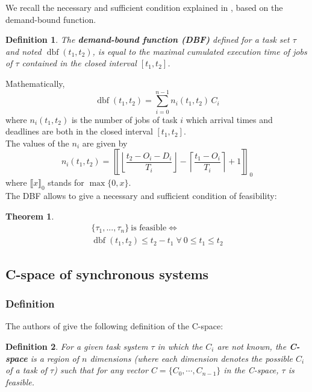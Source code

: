 \documentclass[times, 10pt,twocolumn, a4paper]{article}
\newtheorem{theorem}{Theorem}
\newtheorem{definition}{Definition}
\newcommand{\dbf}[1]{\operatorname{dbf}(#1)}
\begin{document}
	We recall the necessary and sufficient condition explained in \cite{baruah1999generalized, baruah1990algorithms}, based on the demand-bound function.

	\begin{definition}
		The \textbf{demand-bound function (DBF)}
		defined for a task set $\tau$ and noted $\dbf{t_1, t_2}$, is equal to
		the maximal cumulated execution time of jobs of $\tau$ contained in the
		closed interval $[t_1, t_2]$.
	\end{definition}

	Mathematically,
	\[
		\dbf{t_1, t_2} = \sum_{i=0}^{n-1} n_i(t_1, t_2) \, C_i
	\]
	where $n_i(t_1, t_2)$ is the number of jobs of task $i$ which arrival times
	and deadlines are both in the closed interval $[t_1, t_2]$.\\

	The values of the $n_i$ are given by
	\[
		n_i(t_1, t_2) = 
		\left\llbracket
			\left\lfloor
				\frac{t_2 - O_i - D_i}{T_i}
			\right\rfloor - 
			\left\lceil 
				\frac{t_1 - O_i}{T_i} 
			\right\rceil + 1 
		\right\rrbracket_0
	\]
	where $\llbracket x \rrbracket_0$ stands for $\max \{ 0, x \}$.\\

	The DBF allows to give a necessary and sufficient condition of feasibility:

	\begin{theorem}
	\[
		\begin{array}{c}
			\{\tau_1, ..., \tau_n\} \: \text{is feasible}  \iff \\
			\dbf{t_1, t_2} \leq t_2 - t_1 \; \forall \: 0 \leq t_1 \leq t_2
		\end{array}
	\]
	\end{theorem}

	\subsection{C-space of synchronous systems}

		\subsubsection{Definition}

			The authors of \cite{george2009characterization} give the following definition of the C-space:
			\begin{definition}
				For a given task system $\tau$ in which the $C_i$ are not known, the
				\textbf{C-space} is a region of $n$ dimensions (where each dimension denotes
				the possible $C_i$ of a task of $\tau$) such that for any vector $C = \{ C_0, \cdots, C_{n-1}\}$ in the C-space, $\tau$ is feasible.
			\end{definition}
\end{document}

